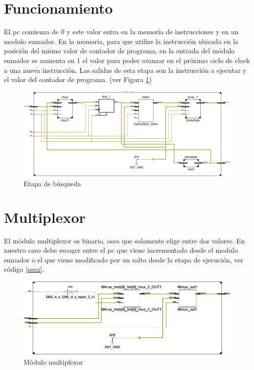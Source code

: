 \section{Funcionamiento}
El \ac{pc} comienza de 0 y este valor entra en la memoria de instrucciones y en un modulo sumador. En la memoria, para que utilize la instrucci\'on ubicada en la posici\'on del mismo valor de contador de programa, en la entrada del m\'odulo sumador se aumenta en 1 el valor para poder avanzar en el pr\'oximo ciclo de clock a una nueva instrucci\'on. Las salidas de esta etapa son la instrucci\'on a ejecutar y el valor del contador de programa.  (ver Figura \ref{fig:fetchzoom})

\begin{figure}[H]
\centering
\includegraphics[scale=0.35]{Capitulo01/etapafetchzoom}
\caption{Etapa de búsqueda}
\label{fig:fetchzoom}
\end{figure}

\section{Multiplexor}

El módulo multiplexor es binario, osea que solamente elige entre dos valores. En nuestro caso debe escoger entre el \ac{pc} que viene incrementado desde el modulo sumador o el que viene modificado por un salto desde la etapa de ejecución, ver código \ref{mux}. 

\begin{figure}[H]
\centering
\includegraphics[scale=0.4]{Capitulo01/mux_fig.png}
\caption{M\'odulo multiplexor}
\label{fig:muxmodule}
\end{figure}

